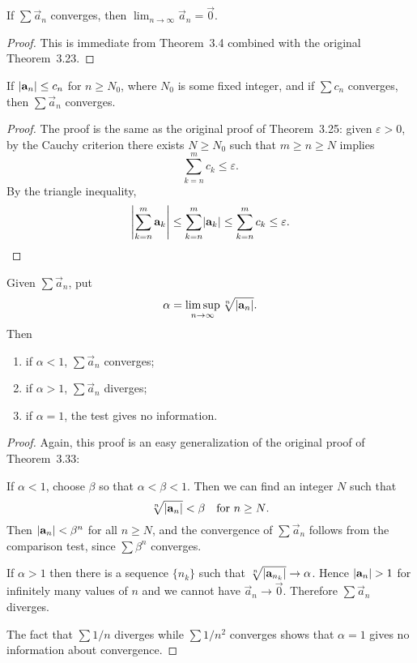 \begin{thm}
  If $\sum\vec{a}_n$ converges, then $\lim_{n\to\infty}\vec{a}_n = \vec0$.
\end{thm}
\begin{proof}
  This is immediate from Theorem~3.4 combined with the original
  Theorem~3.23.
\end{proof}
\begin{thm}
  If $\lvert{\mathbf{a}_n}\rvert\leq c_n$ for $n\geq N_0$, where $N_0$ is
  some fixed integer, and if $\sum c_n$ converges, then
  $\sum\vec{a}_n$ converges.
\end{thm}
\begin{proof}
  The proof is the same as the original proof of Theorem~3.25: given
  $\varepsilon>0$, by the Cauchy criterion there exists $N\geq N_0$
  such that $m\geq n\geq N$ implies
  \begin{equation*}
    \sum_{k=n}^m c_k\leq\varepsilon.
  \end{equation*}
  By the triangle inequality,
  \begin{equation*}
    \left\lvert{\sum_{k=n}^m\mathbf{a}_k}\right\rvert\leq\sum_{k=n}^m\lvert{\mathbf{a}_k}\rvert
    \leq\sum_{k=n}^mc_k\leq\varepsilon. \qedhere
  \end{equation*}
\end{proof}
\begin{thm}
  Given $\sum\vec{a}_n$, put
  \begin{equation*}
    \alpha = \limsup_{n\to\infty}\sqrt[n]{\lvert{\mathbf{a}_n}\rvert}.
  \end{equation*}
  Then
  \begin{enumerate}
  \item if $\alpha < 1$, $\sum\vec{a}_n$ converges;
  \item if $\alpha > 1$, $\sum\vec{a}_n$ diverges;
  \item if $\alpha = 1$, the test gives no information.
  \end{enumerate}
\end{thm}
\begin{proof}
  Again, this proof is an easy generalization of the original proof of
  Theorem~3.33:

  If $\alpha < 1$, choose $\beta$ so that
  $\alpha < \beta < 1$. Then we can find an integer $N$ such that
  \begin{equation*}
    \sqrt[n]{\lvert{\mathbf{a}_n}\rvert} < \beta
    \quad\text{for $n\geq N$}.
  \end{equation*}
  Then $\lvert{\mathbf{a}_n}\rvert<\beta^n$ for all $n\geq N$, and the
  convergence of $\sum\vec{a}_n$ follows from the comparison test,
  since $\sum\beta^n$ converges.

  If $\alpha > 1$ then there is a sequence $\{n_k\}$ such that
  $\sqrt[n]{\lvert{\mathbf{a}_{n_k}}\rvert}\to\alpha$. Hence
  $\lvert{\mathbf{a}_n}\rvert > 1$ for infinitely many values of $n$ and we
  cannot have $\vec{a}_n\to\vec0$. Therefore $\sum\vec{a}_n$ diverges.

  The fact that $\sum1/n$ diverges while $\sum1/n^2$ converges shows
  that $\alpha=1$ gives no information about convergence.
\end{proof}
